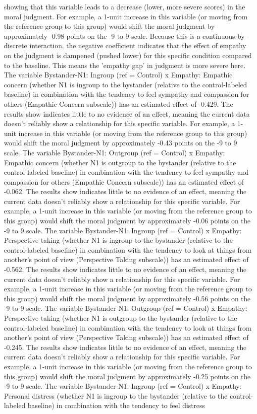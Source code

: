 \documentclass[11pt]{article}
\begin{document}
showing that this variable leads to a decrease (lower, more severe scores) in the moral judgment. For example, a 1-unit increase in this variable (or moving from the reference group to this group) would shift the moral judgment by approximately -0.98 points on the -9 to 9 scale. Because this is a continuous-by-discrete interaction, the negative coefficient indicates that the effect of empathy on the judgment is dampened (pushed lower) for this specific condition compared to the baseline. This means the 'empathy gap' in judgment is more severe here. The variable Bystander-N1: Ingroup (ref = Control) x Empathy: Empathic concern (whether N1 is ingroup to the bystander (relative to the control-labeled baseline) in combination with the tendency to feel sympathy and compassion for others (Empathic Concern subscale)) has an estimated effect of -0.429. The results show indicates little to no evidence of an effect, meaning the current data doesn't reliably show a relationship for this specific variable. For example, a 1-unit increase in this variable (or moving from the reference group to this group) would shift the moral judgment by approximately -0.43 points on the -9 to 9 scale. The variable Bystander-N1: Outgroup (ref = Control) x Empathy: Empathic concern (whether N1 is outgroup to the bystander (relative to the control-labeled baseline) in combination with the tendency to feel sympathy and compassion for others (Empathic Concern subscale)) has an estimated effect of -0.062. The results show indicates little to no evidence of an effect, meaning the current data doesn't reliably show a relationship for this specific variable. For example, a 1-unit increase in this variable (or moving from the reference group to this group) would shift the moral judgment by approximately -0.06 points on the -9 to 9 scale. The variable Bystander-N1: Ingroup (ref = Control) x Empathy: Perspective taking (whether N1 is ingroup to the bystander (relative to the control-labeled baseline) in combination with the tendency to look at things from another's point of view (Perspective Taking subscale)) has an estimated effect of -0.562. The results show indicates little to no evidence of an effect, meaning the current data doesn't reliably show a relationship for this specific variable. For example, a 1-unit increase in this variable (or moving from the reference group to this group) would shift the moral judgment by approximately -0.56 points on the -9 to 9 scale. The variable Bystander-N1: Outgroup (ref = Control) x Empathy: Perspective taking (whether N1 is outgroup to the bystander (relative to the control-labeled baseline) in combination with the tendency to look at things from another's point of view (Perspective Taking subscale)) has an estimated effect of -0.245. The results show indicates little to no evidence of an effect, meaning the current data doesn't reliably show a relationship for this specific variable. For example, a 1-unit increase in this variable (or moving from the reference group to this group) would shift the moral judgment by approximately -0.25 points on the -9 to 9 scale. The variable Bystander-N1: Ingroup (ref = Control) x Empathy: Personal distress (whether N1 is ingroup to the bystander (relative to the control-labeled baseline) in combination with the tendency to feel distress 
\end{document}
